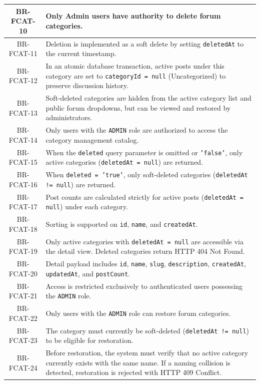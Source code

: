 \begin{longtable}{|c|p{12cm}|}
    BR-FCAT-10 & Only Admin users have authority to delete forum categories. \\ \hline
    BR-FCAT-11 & Deletion is implemented as a soft delete by setting \texttt{deletedAt} to the current timestamp. \\ \hline
    BR-FCAT-12 & In an atomic database transaction, active posts under this category are set to \texttt{categoryId = null} (Uncategorized) to preserve discussion history. \\ \hline
    BR-FCAT-13 & Soft-deleted categories are hidden from the active category list and public forum dropdowns, but can be viewed and restored by administrators. \\ \hline
    BR-FCAT-14 & Only users with the \texttt{ADMIN} role are authorized to access the category management catalog. \\ \hline
    BR-FCAT-15 & When the \texttt{deleted} query parameter is omitted or \texttt{'false'}, only active categories (\texttt{deletedAt = null}) are returned. \\ \hline
    BR-FCAT-16 & When \texttt{deleted = 'true'}, only soft-deleted categories (\texttt{deletedAt != null}) are returned. \\ \hline
    BR-FCAT-17 & Post counts are calculated strictly for active posts (\texttt{deletedAt = null}) under each category. \\ \hline
    BR-FCAT-18 & Sorting is supported on \texttt{id}, \texttt{name}, and \texttt{createdAt}. \\ \hline
    BR-FCAT-19 & Only active categories with \texttt{deletedAt = null} are accessible via the detail view. Deleted categories return HTTP 404 Not Found. \\ \hline
    BR-FCAT-20 & Detail payload includes \texttt{id}, \texttt{name}, \texttt{slug}, \texttt{description}, \texttt{createdAt}, \texttt{updatedAt}, and \texttt{postCount}. \\ \hline
    BR-FCAT-21 & Access is restricted exclusively to authenticated users possessing the \texttt{ADMIN} role. \\ \hline
    BR-FCAT-22 & Only users with the \texttt{ADMIN} role can restore forum categories. \\ \hline
    BR-FCAT-23 & The category must currently be soft-deleted (\texttt{deletedAt != null}) to be eligible for restoration. \\ \hline
    BR-FCAT-24 & Before restoration, the system must verify that no active category currently exists with the same name. If a naming collision is detected, restoration is rejected with HTTP 409 Conflict. \\ \hline

\end{longtable}
